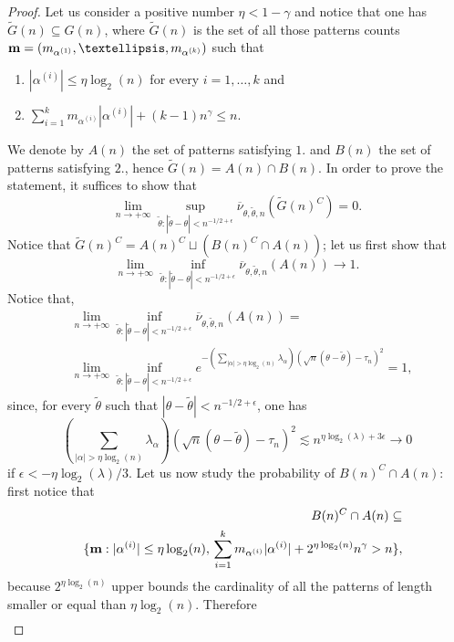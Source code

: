 \documentclass[10pt,a4paper]{amsart}
\begin{document}
\begin{proof}
\bigskip Let us consider a positive number $\eta<1-\gamma$ and notice that one has $\tilde{G}(n) \subseteq G(n)$, where $\tilde{G}(n)$ is the set of all those patterns counts ${\bf m}=(m_{\alpha^{(1)}}, \dots, m_{\alpha^{(k)}})$ such that
\begin{enumerate}
\item $|\alpha^{(i)}| \leq \eta \log_2(n)$ for every $i=1,\dots, k$ and
\item $\sum_{i=1}^{k}m_{\alpha^{(i)}}|\alpha^{(i)}|+(k-1)n^\gamma \leq n$.
\end{enumerate}
We denote by $A(n)$ the set of patterns satisfying $1.$ and $B(n)$ the set of patterns satisfying $2.$, hence $\tilde{G}(n)=A(n) \cap B(n)$. In order to prove the statement, it suffices to show that
$$
\lim_{n \rightarrow +\infty} \sup_{\tilde{\theta}:|\tilde{\theta}-\theta|<n^{-1/2+\epsilon}} \overline{\nu}_{\theta, \tilde{\theta},n}(\tilde{G}(n)^C)=0.$$
Notice that $\tilde{G}(n)^C=A(n)^C \sqcup (B(n)^C\cap A(n))$; let us first show that
$$\lim_{n \rightarrow +\infty} \inf_{\tilde{\theta}:|\tilde{\theta}-\theta|<n^{-1/2+\epsilon}} \overline{\nu}_{\theta, \tilde{\theta},n}(A(n)) \rightarrow 1.$$
Notice that, 
\[\begin{split}
    &\lim_{n \rightarrow +\infty} \inf_{\tilde{\theta}:|\tilde{\theta}-\theta|<n^{-1/2+\epsilon}}\overline{\nu}_{\theta, \tilde{\theta},n}(A(n))=\\
    &\lim_{n \rightarrow +\infty} \inf_{\tilde{\theta}:|\tilde{\theta}-\theta|<n^{-1/2+\epsilon}}e^{-\left (\sum_{|\alpha| > \eta \log_2(n)} \lambda_\alpha \right ) (\sqrt{n}(\theta-\tilde{\theta})-\tau_n)^2}=1,
    \end{split}\]
since, for every $\tilde{\theta}$ such that $|\theta-\tilde{\theta}|<n^{-1/2+\epsilon}$, one has
$$\left (\sum_{|\alpha| > \eta \log_2(n)} \lambda_\alpha \right ) (\sqrt{n}(\theta-\tilde{\theta})-\tau_n)^2 \lesssim n^{\eta \log_2(\lambda) + 3\epsilon}\rightarrow 0$$
if $\epsilon <-\eta \log_2(\lambda)/3$.
Let us now study the probability of $B(n)^C \cap A(n)$: first notice that
\begin{eqnarray*}
&&B(n)^C \cap A(n) \subseteq \\
&&\{ {\bf m} :|\alpha^{(i)}| \leq \eta\log_2(n), \, \sum_{i=1}^{k}m_{\alpha^{(i)}}|\alpha^{(i)}|+2^{\eta \log_2(n)}n^\gamma > n\},
\end{eqnarray*}
because $2^{\eta \log_2(n)}$ upper bounds the cardinality of all the patterns of length smaller or equal than $\eta \log_2(n)$. Therefore
\[\begin{split}

\end{split}\]
\end{proof}
\end{document}
